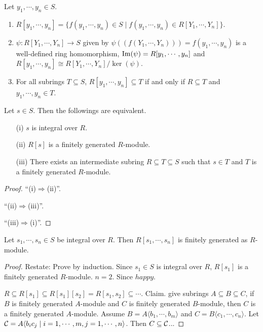\begin{fact}
    Let $y_1,\cdots,y_n \in S$.
    \begin{enumerate}
        \item $R[y_1,\cdots,y_n] = \{f(y_1,\cdots,y_n) \in S \mid f(y_1,\cdots,y_n) \in R[Y_1,\cdots,Y_n]\}$.
        \item $\psi: R[Y_1,\cdots,Y_n] \to S$ given by $\psi((f(Y_1,\cdots,Y_n))) = f(y_1,\cdots,y_n)$ is a well-defined ring homomorphism, $\operatorname{Im}(\psi) = R[y_1,\cdots,y_n]$ and $R[y_1,\cdots,y_n] \cong R[Y_1,\cdots,Y_n]/\ker(\psi)$.
        \item For all subrings $T \subseteq S$, $R[y_1,\cdots,y_n] \subseteq T$ if and only if $R \subseteq T$ and $y_1,\cdots,y_n \in T$.
    \end{enumerate}
\end{fact}

\begin{example}
\end{example}

\begin{proposition}
    Let $s \in S$. Then the followings are equivalent. 
    \begin{enumerate}
        \item[(i)] $s$ is integral over $R$.
        \item[(ii)] $R[s]$ is a finitely generated $R$-module.
        \item[(iii)] There exists an intermediate subring $R \subseteq T \subseteq S$ such that $s \in T$ and $T$ is a finitely generated $R$-module.
    \end{enumerate}
\end{proposition}

\begin{proof}
    ``(i)$\Rightarrow$(ii)''. \par 
    ``(ii)$\Rightarrow$(iii)''. \par 
    ``(iii)$\Rightarrow$(i)''. 
\end{proof}

\begin{theorem}
    Let $s_1,\cdots,s_n \in S$ be integral over $R$. Then $R[s_1,\cdots,s_n]$ is finitely generated as $R$-module.
\end{theorem}

\begin{proof}
    Restate: Prove by induction. Since $s_1 \in S$ is integral over $R$, $R[s_1]$ is a finitely generated $R$-module. $n = 2$. Since $happy$. \par 
    $R \subseteq R[s_1] \subseteq R[s_1][s_2] = R[s_1,s_2] \subseteq \cdots$. Claim. give subrings $A \subseteq B \subseteq C$, if $B$ is finitely generated $A$-module and $C$ is finitely generated $B$-module, then $C$ is a finitely generated $A$-module. Assume $B = A\langle b_1,\cdots,b_m \rangle$ and $C = B\langle c_1,\cdots,c_n \rangle$. Let $\mathcal{C} = A \langle b_ic_j \mid i = 1,\cdots,m, j = 1,\cdots,n\rangle$. Then $C \subseteq \mathcal{C}$...
\end{proof}

